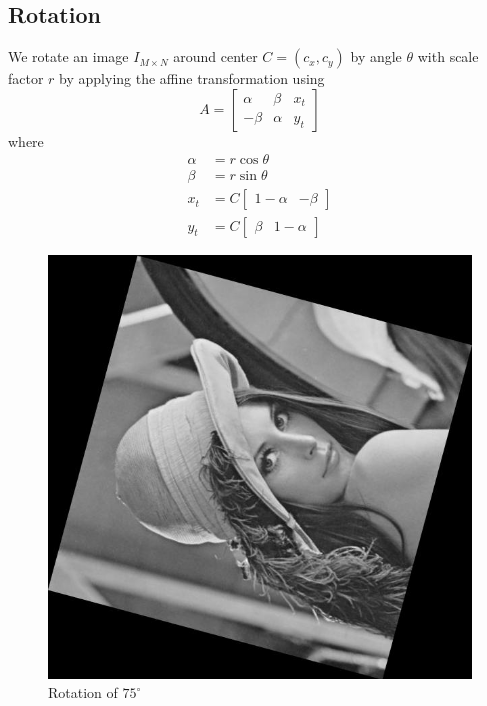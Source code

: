 \subsection{Rotation}

We rotate an image $I_{M\times N}$ around center $C=(c_x, c_y)$ by angle $\theta$ with scale factor $r$ by applying the affine transformation using \[A=\begin{bmatrix}\alpha & \beta & x_t\\-\beta & \alpha & y_t\end{bmatrix}\] where 
\begin{align*}\alpha &= r\cos\theta\\
               \beta &= r\sin\theta\\
               x_t &= C\begin{bmatrix}1 - \alpha & -\beta\end{bmatrix}\\
               y_t &= C\begin{bmatrix}\beta & 1 - \alpha\end{bmatrix}
\end{align*}

\begin{figure}[H]
    \centering
    \includegraphics[scale=0.5]{images/lenna-rotation.jpg}
    \caption{Rotation of $75^{\circ}$}
    \label{fig:lenna-rotation}
\end{figure}